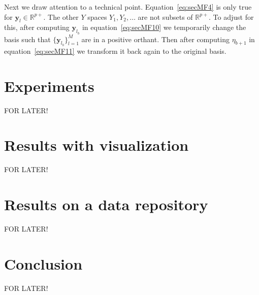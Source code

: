 \documentclass[11pt]{article}
\begin{document}
Next we draw attention to a technical point. Equation~\ref{eq:secMF4} is only true for  $\bm{y}_l \in \mathbb{R}^{p+}$. The other $Y$ spaces $Y_1, Y_2, \ldots $ are not  subsets of $\mathbb{R}^{p+}$. To adjust for this, after computing  $\bm{y}_{l_{b}}$ in equation~\eqref{eq:secMF10} we temporarily change the basis such that  $\{ \bm{y}_{l_{b}}\}_{l=1}^M$ are in a positive orthant.  Then after computing  $\eta_{b+1}$ in equation~\eqref{eq:secMF11} we transform it back again to the original basis. 

\section{Experiments}
FOR LATER!

\section{Results with visualization}
FOR LATER!

\section{Results on a data repository}
FOR LATER!

\section{Conclusion}
FOR LATER!

\footnotesize

\end{document}
